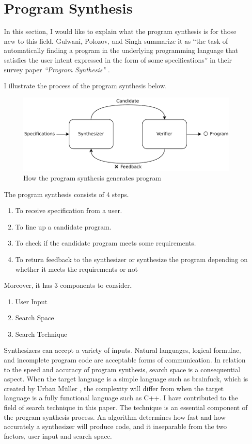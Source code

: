 \documentclass[12pt, a4paper, titlepage]{report}
\begin{document}
  \section{Program Synthesis}
    In this section, I would like to explain what the program synthesis is for those new to this field.
    Gulwani, Polozov, and Singh summarize it as ``the task of automatically finding a program in the underlying programming language that satisfies the user intent expressed in the form of some specifications'' in their survey paper \emph{``Program Synthesis''} \cite{gulwani:2017}.

    I illustrate the process of the program synthesis below.
    \begin{figure}[htbp]
      \centering
      \includegraphics[width=1\textwidth]{images/synthesis.pdf}
      \caption{How the program synthesis generates program}
      \label{synthesisOverview}
    \end{figure}

    The program synthesis consists of 4 steps.
    \begin{enumerate}
      \item To receive specification from a user.
      \item To line up a candidate program.
      \item To check if the candidate program meets some requirements.
      \item To return feedback to the synthesizer or synthesize the program depending on whether it meets the requirements or not
    \end{enumerate}

    Moreover, it has 3 components to consider.
    \begin{enumerate}
      \item User Input
      \item Search Space
      \item Search Technique
    \end{enumerate}
    Synthesizers can accept a variety of inputs.
    Natural languages, logical formulae, and incomplete program code are acceptable forms of communication.
    In relation to the speed and accuracy of program synthesis, search space is a consequential aspect.
    When the target language is a simple language such as brainfuck, which is created by Urban Müller \cite{easter:2020}, the complexity will differ from when the target language is a fully functional language such as C++.
    I have contributed to the field of search technique in this paper.
    The technique is an essential component of the program synthesis process.
    An algorithm determines how fast and how accurately a synthesizer will produce code, and it inseparable from the two factors, user input and search space.
\end{document}
